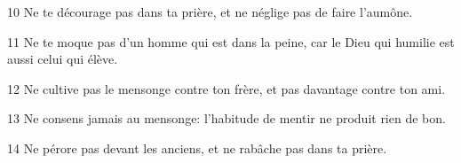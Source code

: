 
10 Ne te décourage pas dans ta prière, et ne néglige pas de faire l’aumône.

11 Ne te moque pas d’un homme qui est dans la peine, car le Dieu qui humilie est aussi celui qui élève.

12 Ne cultive pas le mensonge contre ton frère, et pas davantage contre ton ami.

13 Ne consens jamais au mensonge: l’habitude de mentir ne produit rien de bon.

14 Ne pérore pas devant les anciens, et ne rabâche pas dans ta prière.